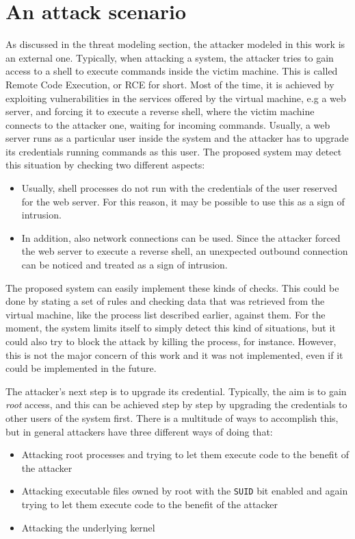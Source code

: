 \section{An attack scenario}
As discussed in the threat modeling section, the attacker modeled in this work is an external one. Typically, when attacking a system, the attacker tries to gain access to a shell to execute commands inside the victim machine. This is called Remote Code Execution, or RCE for short. Most of the time, it is achieved by exploiting vulnerabilities in the services offered by the virtual machine, e.g a web server, and forcing it to execute a reverse shell, where the victim machine connects to the attacker one, waiting for incoming commands. Usually, a web server runs as a particular user inside the system and the attacker has to upgrade its credentials running commands as this user. The proposed system may detect this situation by checking two different aspects: 
\begin{itemize}
    \item Usually, shell processes do not run with the credentials of the user reserved for the web server. For this reason, it may be possible to use this as a sign of intrusion. 
    \item In addition, also network connections can be used. Since the attacker forced the web server to execute a reverse shell, an unexpected outbound connection can be noticed and treated as a sign of intrusion.
\end{itemize}
The proposed system can easily implement these kinds of checks. This could be done by stating a set of rules and checking data that was retrieved from the virtual machine, like the process list described earlier, against them. For the moment, the system limits itself to simply detect this kind of situations, but it could also try to block the attack by killing the process, for instance. However, this is not the major concern of this work and it was not implemented, even if it could be implemented in the future. 
\par
The attacker's next step is to upgrade its credential. Typically, the aim is to gain \emph{root} access, and this can be achieved step by step by upgrading the credentials to other users of the system first. There is a multitude of ways to accomplish this, but in general attackers have three different ways of doing that: 
\begin{itemize}
    \item Attacking root processes and trying to let them execute code to the benefit of the attacker
    \item Attacking executable files owned by root with the \texttt{SUID} bit enabled and again trying to let them execute code to the benefit of the attacker
    \item Attacking the underlying kernel
\end{itemize}
